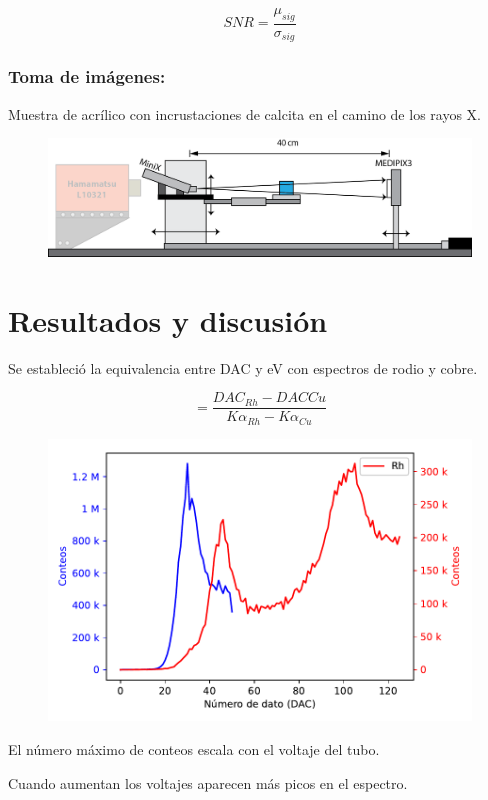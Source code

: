 \documentclass{sciposter}
\begin{document}
\begin{multicols}{3}
	\begin{equation}
	SNR=\frac{\mu_{sig}}{\sigma_{sig}}
	\end{equation}
	
	\subsubsection{Toma de imágenes:}
	Muestra de acrílico con incrustaciones de calcita en el camino de los rayos X.
	
	\begin{figure}[h]
		\centering
		\includegraphics[width = 0.7\linewidth]{Figuras/Ag_Ima.png}
	\end{figure}

\section{Resultados y discusión}
	Se estableció la equivalencia entre DAC y eV con espectros de rodio y cobre.
	
	\begin{equation}
	[\frac{DAC}{eV}]=\frac{DAC_{Rh}-DAC{Cu}}{K\alpha_{Rh}-K\alpha_{Cu}}
	\end{equation}
	
	\begin{figure}[h]
		\centering
		\includegraphics[width = 0.7\linewidth]{Figuras/CalibracionE.pdf}
	\end{figure}

	El número máximo de conteos escala con el voltaje del tubo.
	
	Cuando aumentan los voltajes aparecen más picos en el espectro.
	

\end{multicols}
\end{document}

